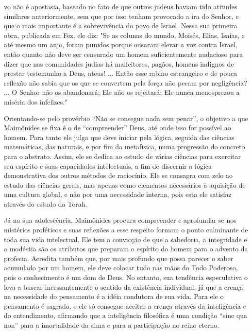 vo não é apostasia, baseado no fato de que outros judeus haviam tido
atitudes similares anteriormente, sem que por isso tenham provocado a
ira do Senhor, e que o mais importante é a sobrevivência do povo de
Israel. Nessa sua primei­ra obra, publicada em Fez, ele diz: "Se as
colunas do mundo, Moisés, Elias, Isaías, e até mesmo um anjo, foram
punidos porque ousaram elevar a voz contra Is­rael, então quanto não
deve ser censurado um homem suficientemente auda­cioso para dizer que
nas comunidades judias há malfeitores, pagãos, homens indignos de
prestar testemunho a Deus, ateus! ... Então esse rabino estrangeiro e de
pouca reflexão não sabia que os que se convertem pela força não pecam
por negligência? ... O Senhor não os abandonará; Ele não os rejeitará:
Ele nun­ca menosprezou a miséria dos infelizes."

Orientando-se pelo provérbio ``Não se consegue nada sem penar'', o
objetivo a que Maimônides se fixa é o de ``compreender'' Deus, até onde
isso for possível ao homem. Para tanto ele julga que deve iniciar pela
lógica, segui­da das ciências matemáticas, das naturais, e por fim da
metafísica, numa pro­gressão do concreto para o abstrato. Assim, ele se
dedica ao estudo de várias ciências para exercitar seu espírito e suas
capacidades intelectuais, a fim de dis­cernir a lógica demonstrativa dos
outros métodos de raciocínio. Ele se consa­gra com zelo ao estudo das
ciências gerais, mas apenas como elementos neces­sários à aquisição de
uma cultura global, e não por uma necessidade interna, pois esta ele
satisfaz através do estudo da Torah.

Já na sua adolescência, Maimônides procura compreender e aprofun­dar-se
nos mistérios proféticos e suas reflexões a esse respeito formam o ponto
culminante de toda sua vida intelectual. Ele tem a convicção de que a
sabedo­ria, a integridade e a modéstia são os atributos que preparam o
espírito do ho­mem para o advento da profecia. Acredita também que, por
mais profundo que possa parecer o saber acumulado por um homem, ele deve
colocar tudo nas mãos do Todo Poderoso, pois o conhecimento é um dom de
Deus. No entan­to, sua tendência especulativa o leva a buscar
incessantemente o sentido da exis­tência individual, já que a crença na
necessidade do pensamento é a idéia con­dutora de sua vida. Para ele o
pensamento é sagrado, e ele só consegue aceitar a crença através da
inteligência e do entendimento, afirmando que a inteligên­cia filosófica
é uma condição ``sine qua non'' para a imortalidade da alma e pa­ra a
participação no reino eterno.


